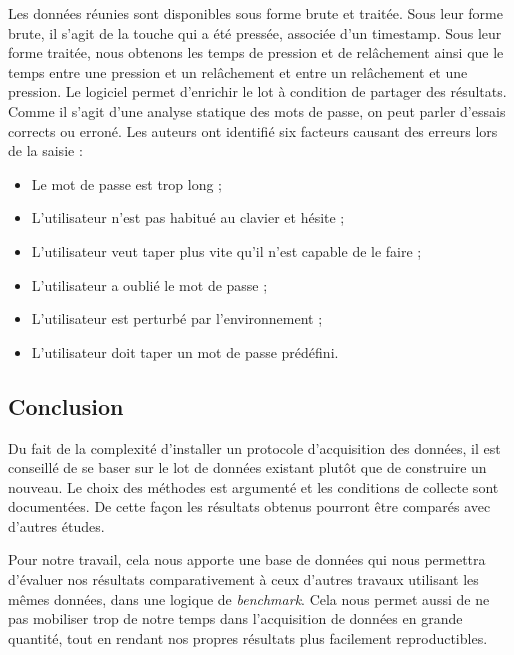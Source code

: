 Les données réunies sont disponibles sous forme brute et traitée. Sous leur forme brute, il s'agit de la touche qui a été pressée, associée d'un timestamp. Sous leur forme traitée, nous obtenons les temps de pression et de relâchement ainsi que le temps entre une pression et un relâchement et entre un relâchement et une pression. Le logiciel permet d'enrichir le lot à condition de partager des résultats.\\

Comme il s'agit d'une analyse statique des mots de passe, on peut parler d'essais corrects ou erroné. Les auteurs ont identifié six facteurs causant des erreurs lors de la saisie :\\

\begin{itemize}
  \item Le mot de passe est trop long ;
  \item L'utilisateur n'est pas habitué au clavier et hésite ;
  \item L'utilisateur veut taper plus vite qu'il n'est capable de le faire ;
  \item L'utilisateur a oublié le mot de passe ;
  \item L'utilisateur est perturbé par l'environnement ;
  \item L'utilisateur doit taper un mot de passe prédéfini.
\end{itemize}

\subsection{Conclusion}

Du fait de la complexité d'installer un protocole d'acquisition des données, il est conseillé de se baser sur le lot de données existant plutôt que de construire un nouveau. Le choix des méthodes est argumenté et les conditions de collecte sont documentées. De cette façon les résultats obtenus pourront être comparés avec d'autres études.

Pour notre travail, cela nous apporte une base de données qui nous permettra d'évaluer nos résultats comparativement à ceux d'autres travaux utilisant les mêmes données, dans une logique de \textit{benchmark}. Cela nous permet aussi de ne pas mobiliser trop de notre temps dans l'acquisition de données en grande quantité, tout en rendant nos propres résultats plus facilement reproductibles.
